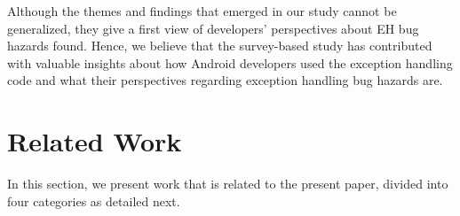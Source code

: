 Although the themes and findings that emerged in our study cannot 
be generalized, they give a first view of developers' perspectives about
 EH bug hazards found. Hence, we believe that the survey-based study 
has contributed with valuable insights about how Android developers 
used the exception handling code and what their perspectives regarding
exception handling bug hazards are.







\section{Related Work}
\label{sec:rele}

In this section, we present work that is related to the present paper, divided into
four categories as detailed next.

